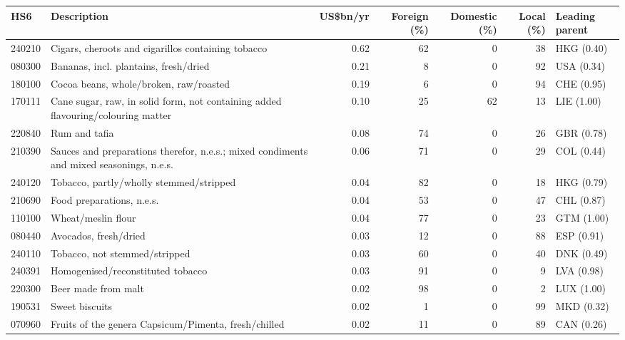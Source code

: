 \begin{tabular}{@{}l p{6.4cm} r r r r l@{}}
\toprule
HS6 & Description & US\$bn/yr & Foreign (\%) & Domestic (\%) & Local (\%) & Leading parent \\
\midrule
240210 & Cigars, cheroots and cigarillos containing tobacco & 0.62 & 62 & 0 & 38 & HKG (0.40) \\
080300 & Bananas, incl. plantains, fresh/\allowbreak{}dried & 0.21 & 8 & 0 & 92 & USA (0.34) \\
180100 & Cocoa beans, whole/\allowbreak{}broken, raw/\allowbreak{}roasted & 0.19 & 6 & 0 & 94 & CHE (0.95) \\
170111 & Cane sugar, raw, in solid form, not containing added flavouring/\allowbreak{}colouring matter & 0.10 & 25 & 62 & 13 & LIE (1.00) \\
220840 & Rum and tafia & 0.08 & 74 & 0 & 26 & GBR (0.78) \\
210390 & Sauces and preparations therefor, n.e.s.; mixed condiments and mixed seasonings, n.e.s. & 0.06 & 71 & 0 & 29 & COL (0.44) \\
240120 & Tobacco, partly/\allowbreak{}wholly stemmed/\allowbreak{}stripped & 0.04 & 82 & 0 & 18 & HKG (0.79) \\
210690 & Food preparations, n.e.s. & 0.04 & 53 & 0 & 47 & CHL (0.87) \\
110100 & Wheat/\allowbreak{}meslin flour & 0.04 & 77 & 0 & 23 & GTM (1.00) \\
080440 & Avocados, fresh/\allowbreak{}dried & 0.03 & 12 & 0 & 88 & ESP (0.91) \\
240110 & Tobacco, not stemmed/\allowbreak{}stripped & 0.03 & 60 & 0 & 40 & DNK (0.49) \\
240391 & Homogenised/\allowbreak{}reconstituted tobacco & 0.03 & 91 & 0 & 9 & LVA (0.98) \\
220300 & Beer made from malt & 0.02 & 98 & 0 & 2 & LUX (1.00) \\
190531 & Sweet biscuits & 0.02 & 1 & 0 & 99 & MKD (0.32) \\
070960 & Fruits of the genera Capsicum/\allowbreak{}Pimenta, fresh/\allowbreak{}chilled & 0.02 & 11 & 0 & 89 & CAN (0.26) \\
\bottomrule
\end{tabular}
